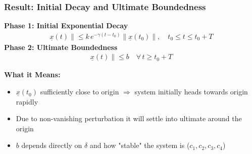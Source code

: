 \documentclass[student, noshadow, lsr, english, aspectratio=169, t]{ITR_LSR_slides}
\begin{document}
\begin{frame}
    \frametitle{Result: Initial Decay and Ultimate Boundedness}
	\vspace{-0.5cm}
	\begin{tcolorbox}[title=Outcome for any initial condition $\|\underline{x}(t_0)\| \leq \sqrt{c_1/c_2} \, r$]
		\textbf{Phase 1: Initial Exponential Decay}
		\begin{align*}
			\underline{x}(t)\| \leq k\, e^{-\gamma (t - t_0)} \|\underline{x}(t_0)\|, \quad t_0 \leq t \leq t_0 + T
		\end{align*}
		\textbf{Phase 2: Ultimate Boundedness}
		\begin{align*}
			\underline{x}(t)\| \leq b \quad \forall\, t \geq t_0 + T
		\end{align*}
	\end{tcolorbox}
    \vspace{0.3cm}
    \textbf{What it Means:}
    \begin{itemize}
        \item $\underline{x}(t_0)$ sufficiently close to origin $\Rightarrow$ system initially heads towards origin rapidly
        \item Due to non-vanishing perturbation it will settle into ultimate around the origin
        \item $b$ depends directly on $\delta$ and how "stable" the system is ($c_1, c_2, c_3, c_4$)
    \end{itemize}

\end{frame}
\end{document}
